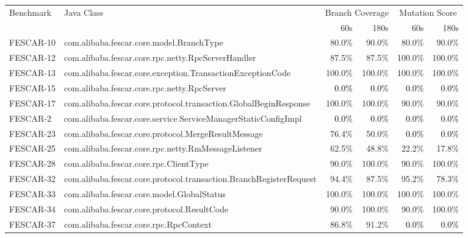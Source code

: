 \begin{tabular}{ ll rr rr}\toprule 
 \multirow{2}{1in}{Benchmark} & \multirow{2}{1in}{Java Class} &  \multicolumn{2}{c}{Branch Coverage} &  \multicolumn{2}{c}{Mutation Score}\\\cmidrule(lr){3-4}\cmidrule(lr){5-6} 
 & & 60s & 180s & 60s & 180s \\ 
\midrule 
FESCAR-10  &  com.alibaba.fescar.core.model.BranchType & 80.0\% & 90.0\% & 80.0\% & 90.0\%\\ 
FESCAR-12  &  com.alibaba.fescar.core.rpc.netty.RpcServerHandler & 87.5\% & 87.5\% & 100.0\% & 100.0\%\\ 
FESCAR-13  &  com.alibaba.fescar.core.exception.TransactionExceptionCode & 100.0\% & 100.0\% & 100.0\% & 100.0\%\\ 
FESCAR-15  &  com.alibaba.fescar.core.rpc.netty.RpcServer & \cellcolor{light-gray} \textcolor{black}{0.0\%} & \cellcolor{light-gray} \textcolor{black}{0.0\%} & \cellcolor{light-gray} \textcolor{black}{0.0\%} & \cellcolor{light-gray} \textcolor{black}{0.0\%}\\ 
FESCAR-17  &  com.alibaba.fescar.core.protocol.transaction.GlobalBeginResponse & 100.0\% & 100.0\% & 90.0\% & 90.0\%\\ 
FESCAR-2  &  com.alibaba.fescar.core.service.ServiceManagerStaticConfigImpl & \cellcolor{light-gray} \textcolor{black}{0.0\%} & \cellcolor{light-gray} \textcolor{black}{0.0\%} & \cellcolor{light-gray} \textcolor{black}{0.0\%} & \cellcolor{light-gray} \textcolor{black}{0.0\%}\\ 
FESCAR-23  &  com.alibaba.fescar.core.protocol.MergeResultMessage & 76.4\% & 50.0\% & \cellcolor{light-gray} \textcolor{black}{0.0\%} & \cellcolor{light-gray} \textcolor{black}{0.0\%}\\ 
FESCAR-25  &  com.alibaba.fescar.core.rpc.netty.RmMessageListener & 62.5\% & 48.8\% & 22.2\% & 17.8\%\\ 
FESCAR-28  &  com.alibaba.fescar.core.rpc.ClientType & 90.0\% & 100.0\% & 90.0\% & 100.0\%\\ 
FESCAR-32  &  com.alibaba.fescar.core.protocol.transaction.BranchRegisterRequest & 94.4\% & 87.5\% & 95.2\% & 78.3\%\\ 
FESCAR-33  &  com.alibaba.fescar.core.model.GlobalStatus & 100.0\% & 100.0\% & 100.0\% & 100.0\%\\ 
FESCAR-34  &  com.alibaba.fescar.core.protocol.ResultCode & 90.0\% & 100.0\% & 90.0\% & 100.0\%\\ 
FESCAR-37  &  com.alibaba.fescar.core.rpc.RpcContext & 86.8\% & 91.2\% & \cellcolor{light-gray} \textcolor{black}{0.0\%} & \cellcolor{light-gray} \textcolor{black}{0.0\%}\\ 

\end{tabular}
